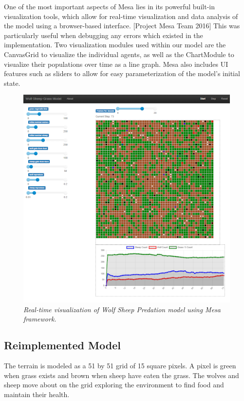         One of the most important aspects of Mesa lies in its powerful built-in
        visualization tools, which allow for real-time visualization and data analysis
        of the model using a browser-based interface. [Project Mesa Team 2016]
        This was particularly useful when debugging any errors which existed in the
        implementation.
        Two visualization modules used within our model are the CanvasGrid to visualize the
        individual agents, as well as the ChartModule to visualize their populations over
        time as a line graph.
        Mesa also includes UI features such as sliders to allow for easy parameterization
        of the model's initial state.

    \begin{figure}[H]
           \includegraphics[width=\linewidth]{./figures/mesa_wsg}
           \caption{\textit{
               Real-time visualization of Wolf Sheep Predation model using Mesa framework.}}
           \label{fig:Mesa WSP}
         \end{figure}

    \subsection{Reimplemented Model}\label{subsec:reimplemented-model}
        The terrain is modeled as a 51 by 51 grid of 15 square pixels.
        A pixel is green when grass exists and brown when sheep have eaten the grass.
        The wolves and sheep move about on the grid exploring the environment to find
        food and maintain their health.

